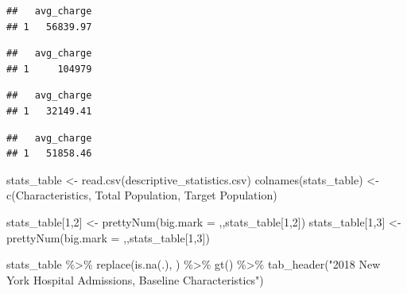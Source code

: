 \documentclass[preprint, 3p,
authoryear]{elsarticle} %
\newenvironment{Shaded}{\begin{snugshade}}{\end{snugshade}}
\newcommand{\AttributeTok}[1]{\textcolor[rgb]{0.77,0.63,0.00}{#1}}
\newcommand{\DecValTok}[1]{\textcolor[rgb]{0.00,0.00,0.81}{#1}}
\newcommand{\FunctionTok}[1]{\textcolor[rgb]{0.00,0.00,0.00}{#1}}
\newcommand{\NormalTok}[1]{#1}
\newcommand{\OtherTok}[1]{\textcolor[rgb]{0.56,0.35,0.01}{#1}}
\newcommand{\SpecialCharTok}[1]{\textcolor[rgb]{0.00,0.00,0.00}{#1}}
\newcommand{\StringTok}[1]{\textcolor[rgb]{0.31,0.60,0.02}{#1}}
\begin{document}
\begin{verbatim}
##   avg_charge
## 1   56839.97
\end{verbatim}

\begin{verbatim}
##   avg_charge
## 1     104979
\end{verbatim}

\begin{verbatim}
##   avg_charge
## 1   32149.41
\end{verbatim}

\begin{verbatim}
##   avg_charge
## 1   51858.46
\end{verbatim}

\begin{Shaded}
\begin{Highlighting}[]
\NormalTok{stats\_table }\OtherTok{\textless{}{-}} \FunctionTok{read.csv}\NormalTok{(}\StringTok{\textquotesingle{}descriptive\_statistics.csv\textquotesingle{}}\NormalTok{)}
\FunctionTok{colnames}\NormalTok{(stats\_table) }\OtherTok{\textless{}{-}} \FunctionTok{c}\NormalTok{(}\StringTok{\textquotesingle{}Characteristics\textquotesingle{}}\NormalTok{, }\StringTok{\textquotesingle{}Total Population\textquotesingle{}}\NormalTok{, }\StringTok{\textquotesingle{}Target Population\textquotesingle{}}\NormalTok{)}

\NormalTok{stats\_table[}\DecValTok{1}\NormalTok{,}\DecValTok{2}\NormalTok{] }\OtherTok{\textless{}{-}} \FunctionTok{prettyNum}\NormalTok{(}\AttributeTok{big.mark =} \StringTok{\textquotesingle{},\textquotesingle{}}\NormalTok{,stats\_table[}\DecValTok{1}\NormalTok{,}\DecValTok{2}\NormalTok{]) }
\NormalTok{stats\_table[}\DecValTok{1}\NormalTok{,}\DecValTok{3}\NormalTok{] }\OtherTok{\textless{}{-}} \FunctionTok{prettyNum}\NormalTok{(}\AttributeTok{big.mark =} \StringTok{\textquotesingle{},\textquotesingle{}}\NormalTok{,stats\_table[}\DecValTok{1}\NormalTok{,}\DecValTok{3}\NormalTok{]) }

\NormalTok{stats\_table }\SpecialCharTok{\%\textgreater{}\%}
\FunctionTok{replace}\NormalTok{(}\FunctionTok{is.na}\NormalTok{(.), }\StringTok{\textquotesingle{} \textquotesingle{}}\NormalTok{) }\SpecialCharTok{\%\textgreater{}\%}
   \FunctionTok{gt}\NormalTok{() }\SpecialCharTok{\%\textgreater{}\%}
  \FunctionTok{tab\_header}\NormalTok{(}\StringTok{"2018 New York Hospital Admissions, Baseline Characteristics"}\NormalTok{)}
\end{Highlighting}
\end{Shaded}
\end{document}
